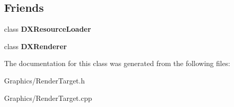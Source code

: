 \subsection*{Friends}
\begin{DoxyCompactItemize}
\item 
\mbox{\label{classRenderTarget_a871268c492209c5a9db9dc2db99f4d04}} 
class {\bfseries D\+X\+Resource\+Loader}
\item 
\mbox{\label{classRenderTarget_a14ab6f966322dccbf6597d0c82bf48c6}} 
class {\bfseries D\+X\+Renderer}
\end{DoxyCompactItemize}


The documentation for this class was generated from the following files\+:\begin{DoxyCompactItemize}
\item 
Graphics/Render\+Target.\+h\item 
Graphics/Render\+Target.\+cpp\end{DoxyCompactItemize}
